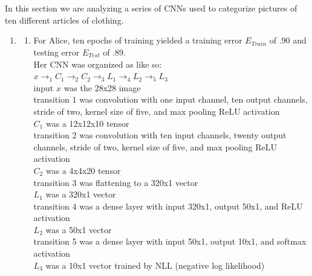 \documentclass[1pt]{article}
\begin{document}
\begin{enumerate}[label=\alph*.)]


\end{enumerate}
\section{   }
In this section we are analyzing a series of CNNs used to categorize pictures of ten different articles of clothing.
\begin{enumerate}[label=\arabic*.]
\item \begin{enumerate}[label=(\alph*)]
\item For Alice, ten epochs of training yielded a training error $E_{Train}$ of $.90$ and testing error $E_{Test}$ of $.89$. \\
Her CNN was organized as like so:\\
$x \rightarrow_1 C_1 \rightarrow_2 C_2 \rightarrow_3 L_1 \rightarrow_4 L_2 \rightarrow_5 L_3 $\\
input $x$ was the 28x28 image\\
transition 1 was convolution with one input channel, ten output channels, stride of two, kernel size of five, and max pooling ReLU activation \\
$C_1$ was a 12x12x10 tensor\\
transition 2 was convolution with ten input channels, twenty output channels, stride of two, kernel size of five, and max pooling ReLU activation \\
$C_2$ was a 4x4x20 tensor\\
transition 3 was flattening to a 320x1 vector\\
$L_1$ was a 320x1 vector\\
transition 4 was a dense layer with input 320x1, output 50x1, and ReLU activation\\
$L_2$ was a 50x1 vector\\
transition 5 was a dense layer with input 50x1, output 10x1, and softmax activation\\
$L_3$ was a 10x1 vector trained by NLL (negative log likelihood)\\

\end{enumerate}
\end{enumerate}
\end{document}
